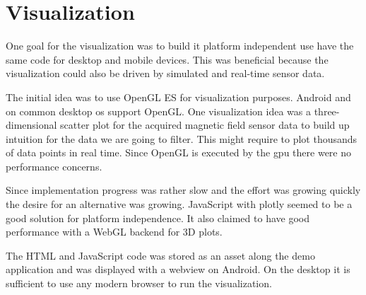 \section{Visualization}

One goal for the visualization was to build it platform independent use have the same code for desktop and mobile devices. This was beneficial because the visualization could also be driven by simulated and real-time sensor data.

The initial idea was to use OpenGL ES for visualization purposes. Android and on common desktop \gls{os} support OpenGL. One visualization idea was a three-dimensional scatter plot for the acquired magnetic field sensor data to build up intuition for the data we are going to filter. This might require to plot thousands of data points in real time. Since OpenGL is executed by the \gls{gpu} there were no performance concerns.

Since implementation progress was rather slow and the effort was growing quickly the desire for an alternative was growing. JavaScript with plotly seemed to be a good solution for platform independence. It also claimed to have good performance with a WebGL backend for 3D plots.

The HTML and JavaScript code was stored as an asset along the demo application and was displayed with a webview on Android. On the desktop it is sufficient to use any modern browser to run the visualization.
